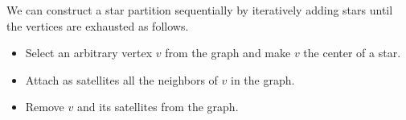 \begin{gram}
We can construct a star partition sequentially by iteratively adding
stars until the vertices are exhausted as follows.

\begin{itemize}

\item Select an arbitrary vertex $v$ from the graph and make $v$ the
  center of a star.

\item Attach as satellites all the neighbors of $v$ in the graph.

\item Remove $v$ and its satellites from the graph.

\end{itemize}
%
\end{gram}

